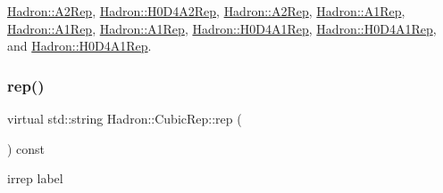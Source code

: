 \mbox{\hyperlink{structHadron_1_1A2Rep_a31e1135ddb204394f1c6153797a7dffa}{Hadron\+::\+A2\+Rep}}, \mbox{\hyperlink{structHadron_1_1H0D4A2Rep_ad23c66fe369200d0ff8bebcabf8dfc62}{Hadron\+::\+H0\+D4\+A2\+Rep}}, \mbox{\hyperlink{structHadron_1_1A2Rep_a31e1135ddb204394f1c6153797a7dffa}{Hadron\+::\+A2\+Rep}}, \mbox{\hyperlink{structHadron_1_1A1Rep_a6b592d902063cfea9bd1cedcdeb9ac79}{Hadron\+::\+A1\+Rep}}, \mbox{\hyperlink{structHadron_1_1A1Rep_a6b592d902063cfea9bd1cedcdeb9ac79}{Hadron\+::\+A1\+Rep}}, \mbox{\hyperlink{structHadron_1_1A1Rep_a6b592d902063cfea9bd1cedcdeb9ac79}{Hadron\+::\+A1\+Rep}}, \mbox{\hyperlink{structHadron_1_1H0D4A1Rep_afbedc9857e7215106a2225ff351ada68}{Hadron\+::\+H0\+D4\+A1\+Rep}}, \mbox{\hyperlink{structHadron_1_1H0D4A1Rep_afbedc9857e7215106a2225ff351ada68}{Hadron\+::\+H0\+D4\+A1\+Rep}}, and \mbox{\hyperlink{structHadron_1_1H0D4A1Rep_afbedc9857e7215106a2225ff351ada68}{Hadron\+::\+H0\+D4\+A1\+Rep}}.

\mbox{\label{structHadron_1_1CubicRep_ac3eb63608803d44c68681f158e14eb1b}} 
\subsubsection{\texorpdfstring{rep()}{rep()}\hspace{0.1cm}{\footnotesize\ttfamily [3/3]}}
{\footnotesize\ttfamily virtual std\+::string Hadron\+::\+Cubic\+Rep\+::rep (\begin{DoxyParamCaption}{ }\end{DoxyParamCaption}) const\hspace{0.3cm}{\ttfamily [pure virtual]}}

irrep label 

